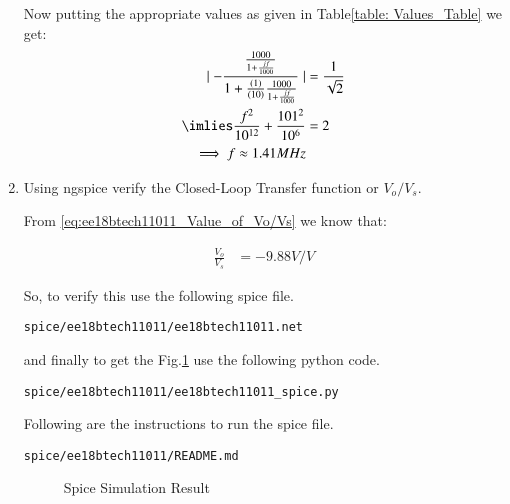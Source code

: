 \begin{enumerate}[label=\thesection.\arabic*.,ref=\thesection.\theenumi]
\begin{table}[!ht]
\centering

\caption{}
\label{table: Values_Table}
\end{table}
Now putting the appropriate values as given in Table\ref{table: Values_Table} we get:
\begin{align}
     \mid-\frac{\frac{1000}{1 + \frac{jf}{1000}}}{1 + \frac{(1)}{(10)}\frac{1000}{1 + \frac{jf}{1000}}}\mid &= \frac{1}{\sqrt{2}}
     \\
     \imlies \frac{f^2}{10^{1 2}} + \frac{101^2}{10^6} &= 2
     \\
     \implies f \approx 1.41MHz
\end{align}

\item Using ngspice verify the Closed-Loop Transfer function or $V_{o}/V_{s}$.

\solution From \ref{eq:ee18btech11011_Value_of_Vo/Vs} we know that:

\begin{align}
    \frac{V_{o}}{V_{s}} &= -9.88V/V
\end{align}

So, to verify this use the following spice file.

\begin{lstlisting}
spice/ee18btech11011/ee18btech11011.net
\end{lstlisting}

and finally to get the Fig.\ref{fig:ee18btech11011_spice_result} use the following python code.

\begin{lstlisting}
spice/ee18btech11011/ee18btech11011_spice.py
\end{lstlisting}

Following are the instructions to run the spice file.
\begin{lstlisting}
spice/ee18btech11011/README.md
\end{lstlisting}

\begin{figure}[!ht]
	\begin{center}
			\resizebox{\columnwidth}{!}{}
	\end{center}
\caption{Spice Simulation Result}
\label{fig:ee18btech11011_spice_result}
\end{figure}

\end{enumerate}

